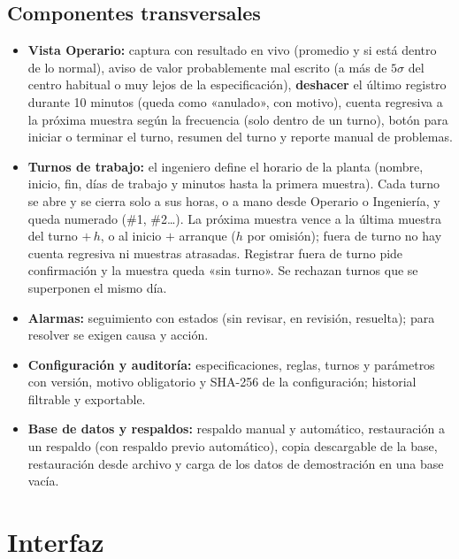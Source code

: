 \documentclass[11pt,a4paper]{article}
\begin{document}
\subsection{Componentes transversales}
\begin{itemize}
\item \textbf{Vista Operario:} captura con resultado en vivo (promedio y si está dentro de lo
  normal), aviso de valor probablemente mal escrito (a más de $5\sigma$ del centro habitual o muy
  lejos de la especificación), \textbf{deshacer} el último registro durante 10 minutos (queda como
  «anulado», con motivo), cuenta regresiva a la próxima muestra según la frecuencia (solo dentro
  de un turno), botón para iniciar o terminar el turno, resumen del turno y reporte manual de
  problemas.
\item \textbf{Turnos de trabajo:} el ingeniero define el horario de la planta (nombre, inicio,
  fin, días de trabajo y minutos hasta la primera muestra). Cada turno se abre y se cierra solo a
  sus horas, o a mano desde Operario o Ingeniería, y queda numerado (\#1, \#2\ldots). La próxima
  muestra vence a la última muestra del turno $+\,h$, o al inicio $+$ arranque ($h$ por omisión);
  fuera de turno no hay cuenta regresiva ni muestras atrasadas. Registrar fuera de turno pide
  confirmación y la muestra queda «sin turno». Se rechazan turnos que se superponen el mismo día.
\item \textbf{Alarmas:} seguimiento con estados (sin revisar, en revisión, resuelta); para
  resolver se exigen causa y acción.
\item \textbf{Configuración y auditoría:} especificaciones, reglas, turnos y parámetros con
  versión, motivo obligatorio y SHA-256 de la configuración; historial filtrable y exportable.
\item \textbf{Base de datos y respaldos:} respaldo manual y automático, restauración a un
  respaldo (con respaldo previo automático), copia descargable de la base, restauración desde
  archivo y carga de los datos de demostración en una base vacía.
\end{itemize}

\section{Interfaz}\label{sec:interfaz}
\end{document}
